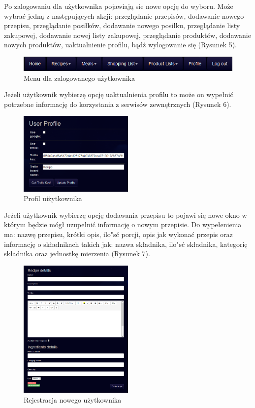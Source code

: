 \documentclass{article}
\begin{document}
Po zalogowaniu dla użytkownika pojawiają sie nowe opcję do wyboru. Może wybrać jedną z następujących akcji: przeglądanie przepisów, dodawanie nowego przepisu, przeglądanie posiłków, dodawanie nowego posiłku, przeglądanie listy zakupowej, dodawanie nowej listy zakupowej, przeglądanie produktów, dodawanie nowych produktów, uaktualnienie profilu, bądź wylogowanie się (Rysunek 5).
\begin{figure}[!ht]
  \centering
    \includegraphics[width=1\textwidth]{reshp4}\par\vspace{1cm}
  \caption{Menu dla zalogowanego użytkownika}
\end{figure}

Jeżeli użytkownik wybierzę opcję uaktualnienia profilu to może on wypełnić potrzebne informację do korzystania z serwisów zewnętrznych (Rysunek 6).
\begin{figure}[!ht]
  \centering
    \includegraphics[width=0.5\textwidth]{reshp5}\par\vspace{1cm}
  \caption{Profil uiżytkownika}
\end{figure}

Jeżeli użytkownik wybierzę opcję dodawania przepisu to pojawi się nowe okno w którym będzie mógł uzupełnić informację o nowym przepisie. Do wypełenienia ma: nazwę przepisu, krótki opis, ilo"sć porcji, opis jak wykonać przepis oraz informację o składnikach takich jak: nazwa składnika, ilo"sć składnika, kategorię składnika oraz jednostkę mierzenia (Rysunek 7).
\begin{figure}[!ht]
  \centering
    \includegraphics[width=0.5\textwidth]{reshp6}\par\vspace{1cm}
  \caption{Rejestracja nowego użytkownika}
\end{figure}
\end{document}
